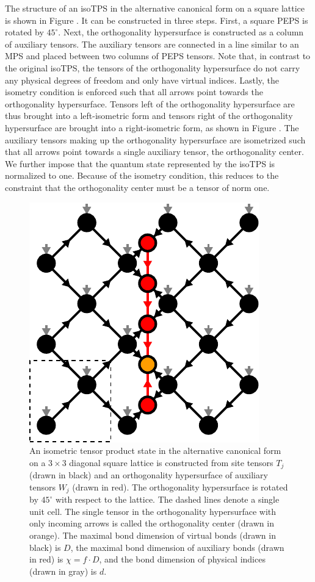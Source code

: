 The structure of an isoTPS in the alternative canonical form on a square lattice is shown in Figure . It can be constructed in three steps. First, a square PEPS is rotated by $45^\circ$. Next, the orthogonality hypersurface is constructed as a column of auxiliary tensors. The auxiliary tensors are connected in a line similar to an MPS and placed between two columns of PEPS tensors. Note that, in contrast to the original isoTPS, the tensors of the orthogonality hypersurface do not carry any physical degrees of freedom and only have virtual indices. Lastly, the isometry condition is enforced such that all arrows point towards the orthogonality hypersurface. Tensors left of the orthogonality hypersurface are thus brought into a left-isometric form and tensors right of the orthogonality hypersurface are brought into a right-isometric form, as shown in Figure . The auxiliary tensors making up the orthogonality hypersurface are isometrized such that all arrows point towards a single auxiliary tensor, the orthogonality center. We further impose that the quantum state represented by the isoTPS is normalized to one. Because of the isometry condition, this reduces to the constraint that the orthogonality center must be a tensor of norm one.\par
\begin{figure}[ht]
	\centering
	\includegraphics[scale=1]{figures/tikz/YB_isoTPS/YB_isoTPS_structure/YB_isoTPS_structure.pdf}
	\caption{An isometric tensor product state in the alternative canonical form on a $3\times3$ diagonal square lattice is constructed from site tensors $T_j$ (drawn in black) and an orthogonality hypersurface of auxiliary tensors $W_j$ (drawn in red). The orthogonality hypersurface is rotated by $45^\circ$ with respect to the lattice. The dashed lines denote a single unit cell. The single tensor in the orthogonality hypersurface with only incoming arrows is called the orthogonality center (drawn in orange). The maximal bond dimension of virtual bonds (drawn in black) is $D$, the maximal bond dimension of auxiliary bonds (drawn in red) is $\chi = f\cdot D$, and the bond dimension of physical indices (drawn in gray) is $d$.}
	\label{fig:YB_isoTPS_structure}
\end{figure}
